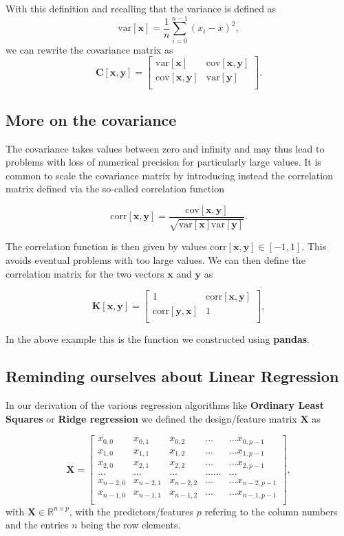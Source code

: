 \documentclass[%
oneside,                 %
final,                   %
10pt]{article}
\begin{document}
With this definition and recalling that the variance is defined as
\[
\mathrm{var}[\bm{x}]=\frac{1}{n} \sum_{i=0}^{n-1}(x_i- \overline{x})^2,
\]
we can rewrite the covariance matrix as 
\[
\bm{C}[\bm{x},\bm{y}] = \begin{bmatrix} \mathrm{var}[\bm{x}] & \mathrm{cov}[\bm{x},\bm{y}] \\
                              \mathrm{cov}[\bm{x},\bm{y}] & \mathrm{var}[\bm{y}] \\
             \end{bmatrix}.
\]

\subsection{More on the covariance}
The covariance takes values between zero and infinity and may thus
lead to problems with loss of numerical precision for particularly
large values. It is common to scale the covariance matrix by
introducing instead the correlation matrix defined via the so-called
correlation function

\[
\mathrm{corr}[\bm{x},\bm{y}]=\frac{\mathrm{cov}[\bm{x},\bm{y}]}{\sqrt{\mathrm{var}[\bm{x}] \mathrm{var}[\bm{y}]}}.
\]

The correlation function is then given by values $\mathrm{corr}[\bm{x},\bm{y}]
\in [-1,1]$. This avoids eventual problems with too large values. We
can then define the correlation matrix for the two vectors $\bm{x}$
and $\bm{y}$ as

\[
\bm{K}[\bm{x},\bm{y}] = \begin{bmatrix} 1 & \mathrm{corr}[\bm{x},\bm{y}] \\
                              \mathrm{corr}[\bm{y},\bm{x}] & 1 \\
             \end{bmatrix},
\]

In the above example this is the function we constructed using \textbf{pandas}.

\subsection{Reminding ourselves about Linear Regression}
In our derivation of the various regression algorithms like \textbf{Ordinary Least Squares} or \textbf{Ridge regression}
we defined the design/feature matrix $\bm{X}$ as

\[
\bm{X}=\begin{bmatrix}
x_{0,0} & x_{0,1} & x_{0,2}& \dots & \dots x_{0,p-1}\\
x_{1,0} & x_{1,1} & x_{1,2}& \dots & \dots x_{1,p-1}\\
x_{2,0} & x_{2,1} & x_{2,2}& \dots & \dots x_{2,p-1}\\
\dots & \dots & \dots & \dots \dots & \dots \\
x_{n-2,0} & x_{n-2,1} & x_{n-2,2}& \dots & \dots x_{n-2,p-1}\\
x_{n-1,0} & x_{n-1,1} & x_{n-1,2}& \dots & \dots x_{n-1,p-1}\\
\end{bmatrix},
\]
with $\bm{X}\in {\mathbb{R}}^{n\times p}$, with the predictors/features $p$  refering to the column numbers and the
entries $n$ being the row elements.
\end{document}
